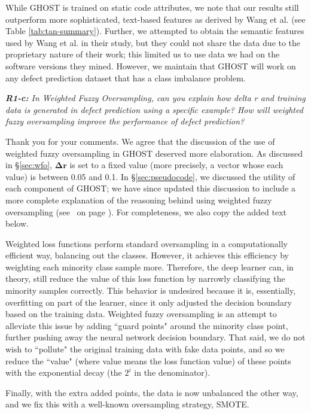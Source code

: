 \documentclass[10pt,compsoc,twocolumn]{IEEEtran}
\newcommand{\respto}[1]{
\fcolorbox{black}{black!15}{%
\label{resp:#1}%
\bf\scriptsize R{#1}}}
\newcommand{\BLUE}{\color{blue}}
\newcommand{\BLACK}{\color{black}}
\newcommand{\citeresp}[1]{%
{(see }\fcolorbox{black}{black!15}{%
\bf\scriptsize R{#1}}~{{on page \pageref{resp:#1})}}}%
\begin{document}
While GHOST is trained on static code attributes, we note that our results still outperform more sophisticated, text-based features as derived by Wang et al. \cite{wang2016automatically} (see Table \ref{tab:tan-summary}). Further, we attempted to obtain the semantic features used by Wang et al. in their study, but they could not share the data due to the proprietary nature of their work; this limited us to use data we had on the software versions they mined. However, we maintain that GHOST will work on any defect prediction dataset that has a class imbalance problem.
\BLACK

{\em {\bf R1-c:} In Weighted Fuzzy Oversampling, can you explain how delta r and training data is generated in defect prediction using a specific example? How will weighted fuzzy oversampling improve the performance of defect prediction?
}

\respto{1a3}
\BLUE
Thank you for your comments. We agree that the discussion of the use of weighted fuzzy oversampling in GHOST deserved more elaboration. As discussed in \S \ref{sec:wfo}, $\boldsymbol \Delta \textbf{r}$ is set to a fixed value (more precisely, a vector whose each value) is between 0.05 and 0.1. In \S \ref{sec:pseudocode}, we discussed the utility of each component of GHOST; we have since updated this discussion to include a more complete explanation of the reasoning behind using weighted fuzzy oversampling \citeresp{1a3.1}. For completeness, we also copy the added text below.

Weighted loss functions perform standard oversampling in a computationally efficient way, balancing out the classes. However, it achieves this efficiency by weighting each minority class sample more. Therefore, the deep learner can, in theory, still reduce the value of this loss function by narrowly classifying the minority samples correctly. This behavior is undesired because it is, essentially, overfitting on part of the learner, since it only adjusted the decision boundary based on the training data. Weighted fuzzy oversampling is an attempt to alleviate this issue by adding ``guard points" around the minority class point, further pushing away the neural network decision boundary. That said, we do not wish to ``pollute" the original training data with fake data points, and so we reduce the ``value" (where value means the loss function value) of these points with the exponential decay (the $2^i$ in the denominator).

Finally, with the extra added points, the data is now unbalanced the other way, and we fix this with a well-known oversampling strategy, SMOTE.
\BLACK
\end{document}
